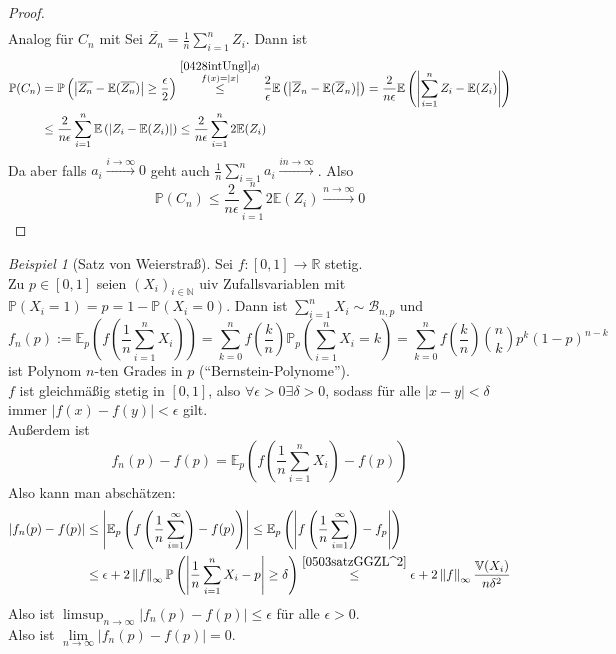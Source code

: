 \documentclass[10pt,a4paper]{article}
\newcommand{\N}{\ensuremath{\mathbb{N}}}
\newcommand{\R}{\ensuremath{\mathbb{R}}}
\newcommand{\ol}[1]{\overline{#1}}
\newcommand{\abs}[1]{\left|#1\right|}
\newcommand{\norm}[1]{\left\|#1\right\|}
\newcommand{\Prb}{\mathbb P}
\newcommand{\Epv}{\ensuremath{\mathbb{E}}}
\newcommand{\Var}{\mathbb{V}}
\newcommand{\scB}{\mathscr B}
\theoremstyle{plain}
\theoremstyle{definition}
\theoremstyle{remark}
\newtheorem{exm}[theorem]{Beispiel}
\begin{document}
\begin{proof}
\begin{align*}
	\end{align*}
	Analog für $C_n$ mit Sei $\ol{Z_n}=\frac{1}{n}\sum_{i=1}^{n}Z_i$. Dann ist
	\begin{align*}
	\Prb(C_n)&=\Prb\left(\abs{\ol{Z_n}-\Epv(\ol{Z_n})}\geq\frac{\epsilon}{2}\right)\overset{\substack{\ref{0428intUngl}d)\\f(x)=\abs{x}}}{\leq}\frac{2}{\epsilon}\Epv\left(\abs{\ol{Z}_n-\Epv(\ol Z_n)}\right)=\frac{2}{n\epsilon}\Epv\left(\abs{\sum_{i=1}^{n}Z_i-\Epv(Z_i)}\right)\\
	&\leq\frac{2}{n\epsilon}\sum_{i=1}^{n}\Epv\left(\abs{Z_i-\Epv(Z_i)}\right)\leq\frac{2}{n\epsilon}\sum_{i=1}^{n}2\Epv(Z_i)
	\end{align*}
	Da aber falls $a_i\xrightarrow{i\to\infty}0$ geht auch $\frac{1}{n}\sum_{i=1}^{n}a_i\xrightarrow{in\to\infty}$. Also
	\[\Prb(C_n)\leq \frac{2}{n\epsilon}\sum_{i=1}^{n}2\Epv(Z_i)\xrightarrow{n\to\infty}0\]
	\end{proof}

	\begin{exm}[Satz von Weierstraß]
		Sei $f:[0,1]\to\R$ stetig.\\
		Zu $p\in[0,1]$ seien $(X_i)_{i\in\N}$ uiv Zufallsvariablen mit $\Prb(X_i=1)=p=1-\Prb(X_i=0)$. Dann ist $\sum_{i=1}^{n}X_i\sim\scB_{n,p}$ und
		\[f_n(p):=\Epv_p\left(f\left(\frac{1}{n}\sum_{i=1}^{n}X_i\right)\right)=\sum_{k=0}^{n}f\left(\frac{k}{n}\right)\Prb_p\left(\sum_{i=1}^{n}X_i=k\right)=\sum_{k=0}^{n}f\left(\frac{k}{n}\right)\binom{n}{k}p^k(1-p)^{n-k}\]
		ist Polynom $n$-ten Grades in $p$ (\enquote{Bernstein-Polynome}).\\
		$f$ ist gleichmäßig stetig in $[0,1]$, also $\forall\epsilon>0\exists\delta>0$, sodass für alle $|x-y|<\delta$ immer $|f(x)-f(y)|<\epsilon$ gilt.\\
		Außerdem ist
		\[f_n(p)-f(p)=\Epv_p\left(f\left(\frac{1}{n}\sum_{i=1}^{n}X_i\right)-f(p)\right)\]
		Also kann man abschätzen:
		\begin{align*}
		|f_n(p)-f(p)|&\leq\abs{\Epv_p\left(f\left(\frac{1}{n}\sum_{i=1}^{\infty}\right)-f(p)\right)}
		\leq \Epv_p\left(\abs{f\left(\frac{1}{n}\sum_{i=1}^{\infty}\right)-f_p}\right)\\
		&\leq \epsilon+ 2\norm{f}_\infty\Prb\left(\abs{\frac{1}{n}\sum_{i=1}^{n}X_i-p}\geq \delta\right)
		\overset{\ref{0503satzGGZL^2}}{\leq} \epsilon+2\norm{f}_\infty\frac{\Var(X_i)}{n\delta^2}
		\end{align*}
		Also ist $\limsup_{n\to\infty}\abs{f_n(p)-f(p)}\leq\epsilon$  für alle $\epsilon>0$.\\
		Also ist $\lim\limits_{n\to\infty}\abs{f_n(p)-f(p)}=0$.
	\end{exm}
	
\end{document}
